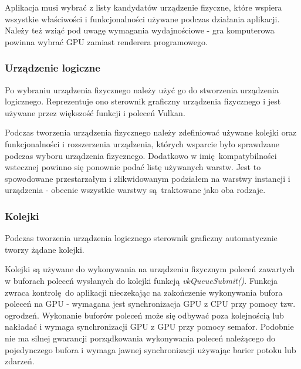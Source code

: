 Aplikacja musi wybrać z listy kandydatów urządzenie fizyczne, które wspiera wszystkie właściwości i funkcjonalności używane podczas działania aplikacji. Należy też wziąć pod uwagę wymagania wydajnościowe - gra komputerowa powinna wybrać GPU zamiast renderera programowego.


\subsubsection{Urządzenie logiczne}

Po wybraniu urządzenia fizycznego należy użyć go do stworzenia urządzenia logicznego. Reprezentuje ono
sterownik graficzny urządzenia fizycznego i jest używane przez większość funkcji i poleceń Vulkan.

Podczas tworzenia urządzenia fizycznego należy zdefiniować używane kolejki oraz funkcjonalności i rozszerzenia urządzenia, których wsparcie było sprawdzane podczas wyboru urządzenia fizycznego.
Dodatkowo w imię kompatybilności wstecznej powinno się ponownie podać listę używanych warstw. Jest to spowodowane przestarzałym i zlikwidowanym podziałem na warstwy instancji i urządzenia - obecnie wszystkie warstwy są traktowane jako oba rodzaje.


\subsubsection{Kolejki}

Podczas tworzenia urządzenia logicznego sterownik graficzny automatycznie tworzy żądane kolejki.

Kolejki są używane do wykonywania na urządzeniu fizycznym poleceń zawartych w buforach poleceń wysłanych do kolejki funkcją \textit{vkQueueSubmit()}. Funkcja zwraca kontrolę do aplikacji nieczekając na zakończenie wykonywania bufora poleceń na GPU - wymagana jest synchronizacja GPU z CPU przy pomocy tzw. ogrodzeń.
Wykonanie buforów poleceń może się odbywać poza kolejnością lub nakładać i wymaga synchronizacji GPU z GPU przy pomocy semafor.
Podobnie nie ma silnej gwarancji porządkowania wykonywania poleceń należącego do pojedynczego bufora i wymaga jawnej synchronizacji używając barier potoku lub zdarzeń.

